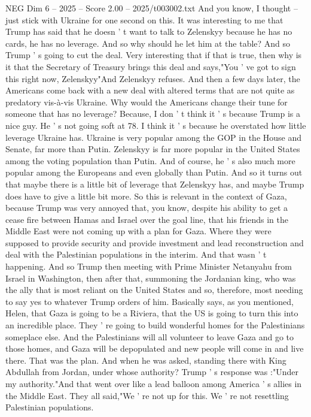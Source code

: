 \begin{textsample}{NEG Dim 6 – 2025 – Score 2.00 – 2025/t003002.txt}
And you know, I thought -- just stick with Ukraine for one second on this.
It was interesting to me that Trump has said that he doesn ' t want to talk to Zelenskyy because he has no cards, he has no leverage.
And so why should he let him at the table?
And so Trump ' s going to cut the deal.
Very interesting that if that is true, then why is it that the Secretary of Treasury brings this deal and says,"You ' ve got to sign this right now, Zelenskyy"And Zelenskyy refuses.
And then a few days later, the Americans come back with a new deal with altered terms that are not quite as predatory vis-à-vis Ukraine.
Why would the Americans change their tune for someone that has no leverage?
Because, I don ' t think it ' s because Trump is a nice guy.
He ' s not going soft at 78.
I think it ' s because he overstated how little leverage Ukraine has.
Ukraine is very popular among the GOP in the House and Senate, far more than Putin.
Zelenskyy is far more popular in the United States among the voting population than Putin.
And of course, he ' s also much more popular among the Europeans and even globally than Putin.
And so it turns out that maybe there is a little bit of leverage that Zelenskyy has, and maybe Trump does have to give a little bit more.
So this is relevant in the context of Gaza, because Trump was very annoyed that, you know, despite his ability to get a cease fire between Hamas and Israel over the goal line, that his friends in the Middle East were not coming up with a plan for Gaza.
Where they were supposed to provide security and provide investment and lead reconstruction and deal with the Palestinian populations in the interim.
And that wasn ' t happening.
And so Trump then meeting with Prime Minister Netanyahu from Israel in Washington, then after that, summoning the Jordanian king, who was the ally that is most reliant on the United States and so, therefore, most needing to say yes to whatever Trump orders of him.
Basically says, as you mentioned, Helen, that Gaza is going to be a Riviera, that the US is going to turn this into an incredible place.
They ' re going to build wonderful homes for the Palestinians someplace else.
And the Palestinians will all volunteer to leave Gaza and go to those homes, and Gaza will be depopulated and new people will come in and live there.
That was the plan.
And when he was asked, standing there with King Abdullah from Jordan, under whose authority?
Trump ' s response was :"Under my authority."And that went over like a lead balloon among America ' s allies in the Middle East.
They all said,"We ' re not up for this.
We ' re not resettling Palestinian populations.

\end{textsample}
